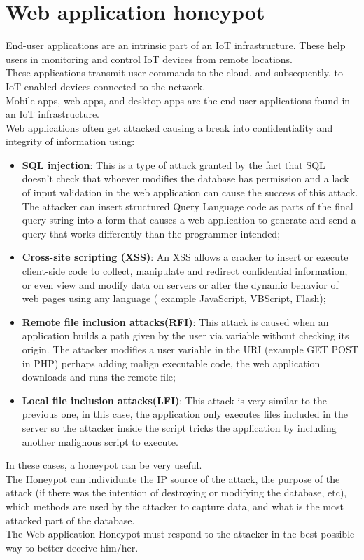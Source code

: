 \section{Web application honeypot}
End-user applications are an intrinsic part of an IoT infrastructure. These help users in monitoring and control IoT devices from remote locations.\\
These applications transmit user commands to the cloud, and subsequently, to IoT-enabled devices connected to the network.\\
Mobile apps, web apps, and desktop apps are the end-user applications found in an IoT infrastructure.\\
Web applications often get attacked causing a break into confidentiality and integrity of information using:
\begin{itemize}
\item \textbf{SQL injection}: This is a type of attack granted by the fact that SQL doesn't check that whoever modifies the database has permission and a lack of input validation in the web application can cause the success of this attack. The attacker can insert structured Query Language code as parts of the final query string into a form that causes a web application to generate and send a query that works differently than the programmer intended;
\item \textbf{Cross-site scripting (XSS)}: An XSS allows a cracker to insert or execute client-side code to collect, manipulate and redirect confidential information, or even view and modify data on servers or alter the dynamic behavior of web pages using any language ( example JavaScript, VBScript, Flash);
\item \textbf{Remote file inclusion attacks(RFI)}: This attack is caused when an application builds a path given by the user via variable without checking its origin. The attacker modifies a user variable in the URI (example GET POST in PHP) perhaps adding malign executable code, the web application downloads and runs the remote file;
\item \textbf{Local file inclusion attacks(LFI)}: This attack is very similar to the previous one, in this case, the application only executes files included in the server so the attacker inside the script tricks the application by including another malignous script to execute.
\end{itemize}
In these cases, a honeypot can be very useful.\\
The Honeypot can individuate the IP source of the attack, the purpose of the attack (if there was the intention of destroying or modifying the database, etc), which methods are used by the attacker to capture data, and what is the most attacked part of the database.\\
The Web application Honeypot must respond to the attacker in the best possible way to better deceive him/her.
